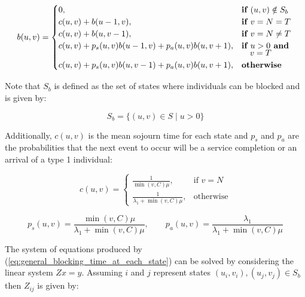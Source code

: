 \begin{equation}\label{eq:general_blocking_time_at_each_state}
    b(u,v) = 
    \begin{cases} 
        0, & \textbf{if } (u,v) \notin S_b \\
        c(u,v) + b(u - 1, v), & \textbf{if } v = N = T\\
        c(u,v) + b(u, v-1), & \textbf{if } v = N \neq T \\
        c(u,v) + p_s(u,v) b(u-1, v) + p_a(u,v) b(u, v+1), & \textbf{if } u > 0 
        \textbf{ and } \vspace{-0.2cm} \\ 
        & \quad v = T \\
        c(u,v) + p_s(u,v) b(u, v-1) + p_a(u,v) b(u, v+1), & \textbf{otherwise} \\
    \end{cases}
\end{equation}

Note that \(S_b\) is defined as the set of states where individuals can be
blocked and is given by:

\begin{equation} \label{eq:set_of_blocking_states}
    S_b = \{(u,v) \in S \; | \; u > 0\}
\end{equation}

Additionally, \(c(u,v)\) is the mean sojourn time for each state and \(p_s\) 
and \(p_a\) are the probabilities that the next event to occur will be a 
service completion or an arrival of a type 1 individual:

\begin{equation}\label{eq:sojourn_blocking_time}
    c(u,v) = 
    \begin{cases}
        \frac{1}{\min(v,C) \mu}, & \text{if } v = N\\
        \frac{1}{\lambda_1 + \min(v,C) \mu}, & \text{otherwise}
    \end{cases}
\end{equation}

\begin{equation}\label{eq:probs_of_service_and_arrival}
    p_s(u,v) = \frac{\min(v,C)\mu}{\lambda_1 + \min(v,C)\mu}, \qquad
    p_a(u,v) = \frac{\lambda_1}{\lambda_1 + \min(v,C)\mu}
\end{equation}

The system of equations produced by 
(\ref{eq:general_blocking_time_at_each_state}) can be solved by considering the 
linear system \(Zx=y\). 
Assuming \(i\) and \(j\) represent states \((u_i, v_i), (u_j, v_j) \in S_b\) 
then \(Z_{ij}\) is given by:


